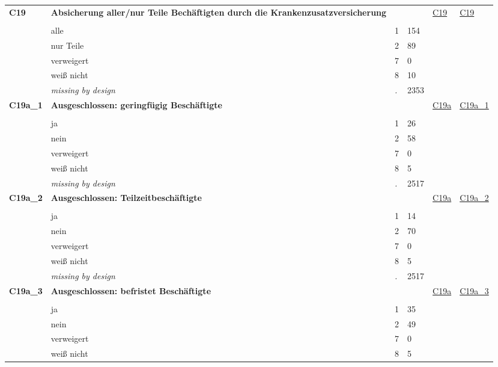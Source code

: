 \begin{longtable}{| L{2.45cm} | L{6cm} | C{1.5cm} | R{1cm} | C{2.25cm} | C{2.25cm} |}
\textbf{C19}\label{var:C19} & \textbf{Absicherung aller/nur Teile Bechäftigten durch die Krankenzusatzversicherung} &  &  & \hyperref[C19]{C19} & \hyperref[var:suf:C19]{C19} \\ 
   &  &  &  &  &  \\ 
   & alle & 1 & 154 &  &  \\ 
   & nur Teile & 2 & 89 &  &  \\ 
   & verweigert & 7 & 0 &  &  \\ 
   & weiß nicht & 8 & 10 &  &  \\ 
   & \textit{missing by design} & \textit{.} & 2353 &  &  \\ 
   \midrule
\textbf{C19a\_1}\label{var:C19a:1} & \textbf{Ausgeschlossen: geringfügig Beschäftigte} &  &  & \hyperref[C19a]{C19a} & \hyperref[var:suf:C19a:1]{C19a\_1} \\ 
   &  &  &  &  &  \\ 
   & ja & 1 & 26 &  &  \\ 
   & nein & 2 & 58 &  &  \\ 
   & verweigert & 7 & 0 &  &  \\ 
   & weiß nicht & 8 & 5 &  &  \\ 
   & \textit{missing by design} & \textit{.} & 2517 &  &  \\ 
   \midrule
\textbf{C19a\_2}\label{var:C19a:2} & \textbf{Ausgeschlossen: Teilzeitbeschäftigte} &  &  & \hyperref[C19a]{C19a} & \hyperref[var:suf:C19a:2]{C19a\_2} \\ 
   &  &  &  &  &  \\ 
   & ja & 1 & 14 &  &  \\ 
   & nein & 2 & 70 &  &  \\ 
   & verweigert & 7 & 0 &  &  \\ 
   & weiß nicht & 8 & 5 &  &  \\ 
   & \textit{missing by design} & \textit{.} & 2517 &  &  \\ 
   \midrule
\textbf{C19a\_3}\label{var:C19a:3} & \textbf{Ausgeschlossen: befristet Beschäftigte} &  &  & \hyperref[C19a]{C19a} & \hyperref[var:suf:C19a:3]{C19a\_3} \\ 
   &  &  &  &  &  \\ 
   & ja & 1 & 35 &  &  \\ 
   & nein & 2 & 49 &  &  \\ 
   & verweigert & 7 & 0 &  &  \\ 
   & weiß nicht & 8 & 5 &  &  \\ 

\end{longtable}

